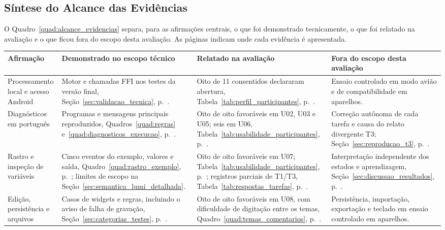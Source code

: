 \begin{landscape}
\section{Síntese do Alcance das Evidências}
\label{sec:sintese_evidencias}

O Quadro~\ref{quad:alcance_evidencias} separa, para as afirmações centrais, o que
foi demonstrado tecnicamente, o que foi relatado na avaliação e o que ficou fora do
escopo desta avaliação. As páginas indicam onde cada evidência é apresentada.

\begin{quadro}[htb]
\centering
{}
\footnotesize
\renewcommand{\arraystretch}{1.12}
\begin{tabular}{|P{2.7cm}|P{6.2cm}|P{5.7cm}|P{7.4cm}|}
\hline
Afirmação & Demonstrado no escopo técnico & Relatado na avaliação & Fora do escopo desta avaliação \\
\hline\hline
Processamento local e acesso Android & Motor e chamadas FFI nos testes da versão final, Seção~\ref{sec:validacao_tecnica}, p.~\pageref{sec:validacao_tecnica}. & Oito de 11 consentidos declararam abertura, Tabela~\ref{tab:perfil_participantes}, p.~\pageref{tab:perfil_participantes}. & Ensaio controlado em modo avião e de compatibilidade em aparelhos. \\
\hline
Diagnósticos em português & Programas e mensagens principais reproduzidos, Quadros~\ref{quad:regras} e~\ref{quad:diagnosticos_execucao}, p.~\pageref{quad:regras}. & Oito de oito favoráveis em U02, U03 e U05; seis em U06, Tabela~\ref{tab:usabilidade_participantes}, p.~\pageref{tab:usabilidade_participantes}. & Correção autônoma de cada tarefa e causa do relato divergente T3; Seção~\ref{sec:reproducao_t3}, p.~\pageref{sec:reproducao_t3}. \\
\hline
Rastro e inspeção de variáveis & Cinco eventos do exemplo, valores e saída, Quadro~\ref{quad:rastro_exemplo}, p.~\pageref{quad:rastro_exemplo}; limites de escopo na Seção~\ref{sec:semantica_lumi_detalhada}. & Oito de oito favoráveis em U07; Tabela~\ref{tab:usabilidade_participantes}, p.~\pageref{tab:usabilidade_participantes}; registros parciais de T1/T3, Tabela~\ref{tab:respostas_tarefas}, p.~\pageref{tab:respostas_tarefas}. & Interpretação independente dos estados e aprendizagem, Seção~\ref{sec:discussao_resultados}, p.~\pageref{sec:discussao_resultados}. \\
\hline
Edição, persistência e arquivos & Casos de widgets e regras, incluindo o aviso de falha de gravação, Seção~\ref{sec:categorias_testes}, p.~\pageref{sec:categorias_testes}. & Oito de oito favoráveis em U08, com dificuldade de digitação entre os temas, Quadro~\ref{quad:temas_comentarios}, p.~\pageref{quad:temas_comentarios}. & Persistência, importação, exportação e teclado em ensaio controlado em aparelhos. \\

\end{tabular}
\end{quadro}
\end{landscape}
